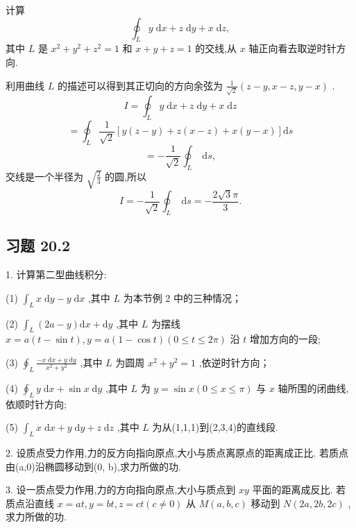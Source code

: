 \begin{example}

\end{example}
计算
\[
{\oint }_{L}y\mathrm{\;d}x + z\mathrm{\;d}y + x\mathrm{\;d}z,
\]
其中 \(L\) 是 \({x}^{2} + {y}^{2} + {z}^{2} = 1\) 和 \(x + y + z = 1\) 的交线,从 \(x\) 轴正向看去取逆时针方向.

\begin{solution}

\end{solution}
利用曲线 \(L\) 的描述可以得到其正切向的方向余弦为 \(\frac{1}{\sqrt{2}}\left( {z - y,x - z,y - x}\right)\) .
\[
I = {\oint }_{L}y\mathrm{\;d}x + z\mathrm{\;d}y + x\mathrm{\;d}z
\]
\[
= {\oint }_{L}\frac{1}{\sqrt{2}}\left\lbrack  {y\left( {z - y}\right)  + z\left( {x - z}\right)  + x\left( {y - x}\right) }\right\rbrack  \mathrm{d}s
\]
\[
=  - \frac{1}{\sqrt{2}}{\oint }_{L}\mathrm{\;d}s,
\]
交线是一个半径为 \(\sqrt{\frac{2}{3}}\) 的圆,所以
\[
I =  - \frac{1}{\sqrt{2}}{\oint }_{L}\mathrm{\;d}s =  - \frac{2\sqrt{3}\pi }{3}.
\]
\subsection{习题 20.2}

1. 计算第二型曲线积分:

(1) \({\int }_{L}x\mathrm{\;d}y - y\mathrm{\;d}x\) ,其中 \(L\) 为本节例 2 中的三种情况；

(2) \({\int }_{L}\left( {{2a} - y}\right) \mathrm{d}x + \mathrm{d}y\) ,其中 \(L\) 为摆线 \(x = a\left( {t - \sin t}\right) ,y = a\left( {1 - \cos t}\right) \left( {0 \leq  t \leq  {2\pi }}\right)\) 沿 \(t\) 增加方向的一段;

(3) \({\oint }_{L}\frac{-x\mathrm{\;d}x + y\mathrm{\;d}y}{{x}^{2} + {y}^{2}}\) ,其中 \(L\) 为圆周 \({x}^{2} + {y}^{2} = 1\) ,依逆时针方向；

(4) \({\oint }_{L}y\mathrm{\;d}x + \sin x\mathrm{\;d}y\) ,其中 \(L\) 为 \(y = \sin x\left( {0 \leq  x \leq  \pi }\right)\) 与 \(x\) 轴所围的闭曲线,依顺时针方向;

(5) \({\int }_{L}x\mathrm{\;d}x + y\mathrm{\;d}y + z\mathrm{\;d}z\) ,其中 \(L\) 为从(1,1,1)到(2,3,4)的直线段.

2. 设质点受力作用,力的反方向指向原点,大小与质点离原点的距离成正比. 若质点由(a,0)沿椭圆移动到(0, b),求力所做的功.

3. 设一质点受力作用,力的方向指向原点,大小与质点到 \({xy}\) 平面的距离成反比. 若质点沿直线 \(x = {at},y = {bt},z = {ct}\left( {c \neq  0}\right)\) 从 \(M\left( {a,b,c}\right)\) 移动到 \(N\left( {{2a},{2b},{2c}}\right)\) ,求力所做的功.

